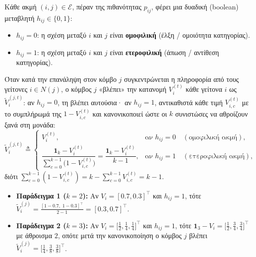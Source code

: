 \documentclass[11pt, a4paper]{article}
\theoremstyle{definition}
\theoremstyle{definition}
\begin{document}
Κάθε ακμή $(i, j) \in \mathcal{E}$, πέραν της πιθανότητας $p_{ij}$, φέρει μια δυαδική (boolean) μεταβλητή $h_{ij} \in \{0, 1\}$:
\begin{itemize}
\item $h_{ij} = 0$: η σχέση μεταξύ $i$ και $j$ είναι \textbf{ομοφιλική} (έλξη / ομοιότητα κατηγορίας).
\item $h_{ij} = 1$: η σχέση μεταξύ $i$ και $j$ είναι \textbf{ετεροφιλική} (άπωση / αντίθεση κατηγορίας).
\end{itemize}
Όταν κατά την επανάληψη στον κόμβο $j$ συγκεντρώνεται η πληροφορία από τους γείτονες $i \in N(j)$, ο κόμβος $j$ «βλέπει» την κατανομή $V_i^{(t)}$ κάθε γείτονα $i$ ως $\tilde{V}_i^{(j,t)}$: αν $h_{ij} = 0$, τη βλέπει αυτούσια· αν $h_{ij} = 1$, αντικαθιστά κάθε τιμή $V_{i,c}^{(t)}$ με το συμπλήρωμά της $1 - V_{i,c}^{(t)}$ και κανονικοποιεί ώστε οι $k$ συνιστώσες να αθροίζουν ξανά στη μονάδα:
\begin{equation}\label{eq:heterophily_inversion_gr}
\tilde{V}_i^{(j,t)} \triangleq \begin{cases}
V_i^{(t)}, & \text{αν } h_{ij} = 0 \quad (\text{ομοφιλική ακμή}),\\[8pt]
\dfrac{\mathbf{1}_k - V_i^{(t)}}{\displaystyle\sum_{c=0}^{k-1} \big(1 - V_{i,c}^{(t)}\big)} = \dfrac{\mathbf{1}_k - V_i^{(t)}}{k - 1}, & \text{αν } h_{ij} = 1 \quad (\text{ετεροφιλική ακμή}),
\end{cases}
\end{equation}
διότι $\sum_{c=0}^{k-1} (1 - V_{i,c}^{(t)}) = k - \sum_{c=0}^{k-1} V_{i,c}^{(t)} = k - 1$.
\begin{itemize}
\item \textbf{Παράδειγμα 1 ($k = 2$):} Αν $V_i = [0.7, 0.3]^\top$ και $h_{ij} = 1$, τότε $\tilde{V}_i^{(j)} = \frac{[1-0.7,\; 1-0.3]^\top}{2 - 1} = [0.3, 0.7]^\top$.
\item \textbf{Παράδειγμα 2 ($k = 3$):} Αν $V_i = \big[\frac{1}{2}, \frac{1}{4}, \frac{1}{4}\big]^\top$ και $h_{ij} = 1$, τότε $\mathbf{1}_3 - V_i = \big[\frac{1}{2}, \frac{3}{4}, \frac{3}{4}\big]^\top$ με άθροισμα $2$, οπότε μετά την κανονικοποίηση ο κόμβος $j$ βλέπει $\tilde{V}_i^{(j)} = \big[\frac{1}{4}, \frac{3}{8}, \frac{3}{8}\big]^\top$.
\end{itemize}
\end{document}
